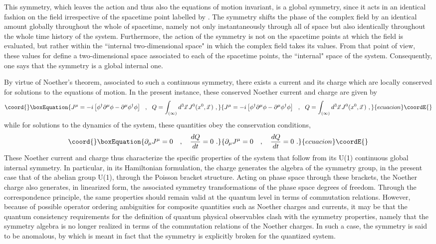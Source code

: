 \documentclass[a4paper,11pt]{article}
\begin{document}
This symmetry, which leaves the action and thus also the equations of motion
invariant, is a global symmetry, since it acts in an identical fashion on
the field \coordHE{} irrespective of the spacetime point labelled by \coordHE{}.
The symmetry shifts the phase of the complex field by an identical amount
globally throughout the whole of spacetime, namely not only instantaneously
through all of space but also identically throughout the whole time history
of the system. Furthermore, the action of the symmetry is not on the spacetime
points at which the field is evaluated, but rather within the ``internal 
two-dimensional space" in which the complex field takes its values. From
that point of view, these values for \coordHE{} define a two-dimensional
space associated to each of the spacetime points, the ``internal" space of 
the system. Consequently, one says that the symmetry is a global internal one.

By virtue of Noether's theorem, associated to such a continuous symmetry,
there exists a current and its charge which are locally conserved for
solutions to the equations of motion. In the present instance, these conserved
Noether current and charge are given by
\begin{equation}\coord{}\boxEquation{
J^\mu=-i\left[\phi^\dagger\partial^\mu\phi-
\partial^\mu\phi^\dagger\phi\right]\ \ ,\ \ 
Q=\int_{(\infty)}d^3\vec{x}\,J^0(x^0,\vec{x}\,)\ ,
}{
J^\mu=-i\left[\phi^\dagger\partial^\mu\phi-
\partial^\mu\phi^\dagger\phi\right]\ \ ,\ \ 
Q=\int_{(\infty)}d^3\vec{x}\,J^0(x^0,\vec{x}\,)\ ,
}{ecuacion}\coordE{}\end{equation}
while for solutions to the dynamics of the system, these quantities
obey the conservation conditions,
\begin{equation}\coord{}\boxEquation{
\partial_\mu J^\mu=0\ \ \ ,\ \ \ \frac{dQ}{dt}=0\ .
}{
\partial_\mu J^\mu=0\ \ \ ,\ \ \ \frac{dQ}{dt}=0\ .
}{ecuacion}\coordE{}\end{equation}
These Noether current and charge thus characterize the specific properties 
of the system that follow from its U(1) continuous global internal symmetry. 
In particular, in its Hamiltonian formulation, the charge \myHighlight{$Q$}\coordHE{} generates 
the algebra of the symmetry group, in the present case that of the abelian 
group U(1), through the Poisson bracket structure. Acting on phase space 
through these brackets, the Noether charge also generates, in linearized 
form, the associated symmetry transformations of the phase space degrees of 
freedom. Through the correspondence principle, the same properties should 
remain valid at the quantum level in terms of commutation relations. However, 
because of possible operator ordering ambiguities for composite quantities 
such as Noether charges and currents, it may be that the quantum consistency 
requirements for the definition of quantum physical observables clash with the
symmetry properties, namely that the symmetry algebra is no longer
realized in terms of the commutation relations of the Noether charges.
In such a case, the symmetry is said to be anomalous, by which is meant in
fact that the symmetry is explicitly broken for the quantized system.
\end{document}
